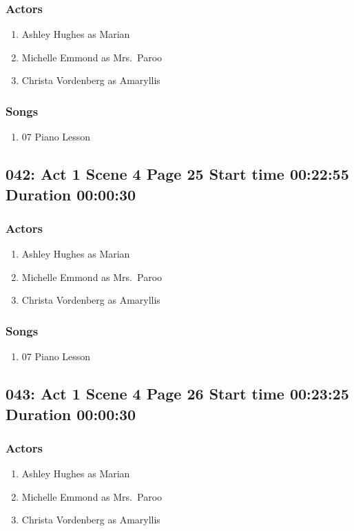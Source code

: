 \subsubsection{Actors}
\begin{enumerate}
\item Ashley Hughes as Marian
\item Michelle Emmond as Mrs.~Paroo
\item Christa Vordenberg as Amaryllis
\end{enumerate}

\subsubsection{Songs}
\begin{enumerate}
\item 07 Piano Lesson
\end{enumerate}
\subsection{042: Act 1 Scene 4 Page 25 Start time 00:22:55 Duration 00:00:30}

\subsubsection{Actors}
\begin{enumerate}
\item Ashley Hughes as Marian
\item Michelle Emmond as Mrs.~Paroo
\item Christa Vordenberg as Amaryllis
\end{enumerate}

\subsubsection{Songs}
\begin{enumerate}
\item 07 Piano Lesson
\end{enumerate}
\subsection{043: Act 1 Scene 4 Page 26 Start time 00:23:25 Duration 00:00:30}

\subsubsection{Actors}
\begin{enumerate}
\item Ashley Hughes as Marian
\item Michelle Emmond as Mrs.~Paroo
\item Christa Vordenberg as Amaryllis
\end{enumerate}

